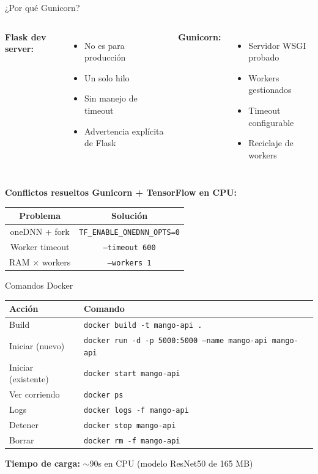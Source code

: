 \documentclass[aspectratio=169]{beamer}
\begin{document}
\begin{frame}{¿Por qué Gunicorn?}
  \begin{columns}
    \textbf{Flask dev server:}
    \begin{itemize}
      \item No es para producción
      \item Un solo hilo
      \item Sin manejo de timeout
      \item Advertencia explícita de Flask
    \end{itemize}

    \textbf{Gunicorn:}
    \begin{itemize}
      \item Servidor WSGI probado
      \item Workers gestionados
      \item Timeout configurable
      \item Reciclaje de workers
    \end{itemize}
  \end{columns}

  \vspace{1em}
  \textbf{Conflictos resueltos Gunicorn + TensorFlow en CPU:}

  \begin{tabular}{|c|c|}
    \hline
    \textbf{Problema} & \textbf{Solución} \\
    \hline
    oneDNN + fork & \texttt{TF\_ENABLE\_ONEDNN\_OPTS=0} \\
    Worker timeout & \texttt{--timeout 600} \\
    RAM × workers & \texttt{--workers 1} \\
    \hline
  \end{tabular}
\end{frame}

\begin{frame}{Comandos Docker}
  \centering
  \begin{tabular}{|l|l|}
    \hline
    \textbf{Acción} & \textbf{Comando} \\
    \hline
    Build & \texttt{docker build -t mango-api .} \\
    Iniciar (nuevo) & \texttt{docker run -d -p 5000:5000 --name mango-api mango-api} \\
    Iniciar (existente) & \texttt{docker start mango-api} \\
    Ver corriendo & \texttt{docker ps} \\
    Logs & \texttt{docker logs -f mango-api} \\
    Detener & \texttt{docker stop mango-api} \\
    Borrar & \texttt{docker rm -f mango-api} \\
    \hline
  \end{tabular}

  \vspace{1em}
  \textbf{Tiempo de carga:} $\sim$90s en CPU (modelo ResNet50 de 165 MB)
\end{frame}
\end{document}
